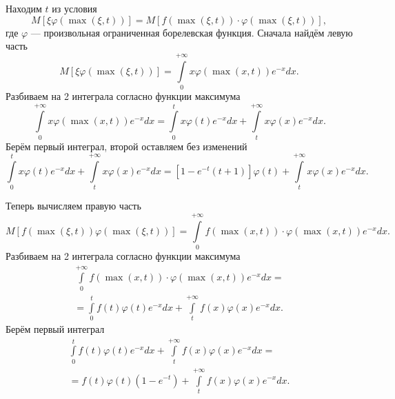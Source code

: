 \begin{enumerate}[label=\alph*)]
  Находим $t$ из условия
  $$M \left[ \xi \varphi \left( \max \left( \xi, t \right) \right) \right] =
    M \left[
      f \left( \max \left( \xi, t \right) \right) \cdot
      \varphi \left( \max \left( \xi, t \right) \right)
    \right],$$
  где $ \varphi $ --- произвольная ограниченная борелевская функция.
  Сначала найдём левую часть
  $$M \left[ \xi \varphi \left( \max \left( \xi, t \right) \right) \right] =
    \int \limits_0^{+ \infty } x \varphi \left( \max \left( x, t \right) \right) e^{-x} dx.$$
  Разбиваем на 2 интеграла согласно функции максимума
  $$ \int \limits_0^{+ \infty } x \varphi \left( \max \left( x, t \right) \right) e^{-x} dx =
    \int \limits_0^t x \varphi \left( t \right) e^{-x} dx +
    \int \limits_t^{+ \infty } x \varphi \left( x \right) e^{-x} dx.$$
  Берём первый интеграл, второй оставляем без изменений
  $$ \int \limits_0^t x \varphi \left( t \right) e^{-x} dx +
    \int \limits_t^{+ \infty } x \varphi \left( x \right) e^{-x} dx =
    \left[ 1 - e^{-t} \left( t + 1 \right) \right] \varphi \left( t \right) +
    \int \limits_t^{+ \infty } x \varphi \left( x \right) e^{-x} dx.$$

  Теперь вычисляем правую часть
  $$M \left[
      f \left( \max \left( \xi, t \right) \right) \varphi \left( \max \left( \xi, t \right) \right)
    \right] =
    \int \limits_0^{+ \infty }
      f \left( \max \left( x, t \right) \right) \cdot
      \varphi \left( \max \left( x, t \right) \right) e^{-x}
    dx.$$
  Разбиваем на 2 интеграла согласно функции максимума
  \begin{equation*}
    \begin{split}
      \int \limits_0^{+ \infty }
        f \left( \max \left( x, t \right) \right) \cdot
        \varphi \left( \max \left( x, t \right) \right) e^{-x}
      dx = \\
      = \int \limits_0^t f \left( t \right) \varphi \left( t \right) e^{-x} dx +
      \int \limits_t^{+ \infty } f \left( x \right) \varphi \left( x \right) e^{-x} dx.
    \end{split}
  \end{equation*}
  Берём первый интеграл
  \begin{equation*}
    \begin{split}
      \int \limits_0^t f \left( t \right) \varphi \left( t \right) e^{-x} dx +
      \int \limits_t^{+ \infty } f \left( x \right) \varphi \left( x \right) e^{-x} dx = \\
      = f \left( t \right) \varphi \left( t \right) \left( 1 - e^{-t} \right) +
      \int \limits_t^{+ \infty } f \left( x \right) \varphi \left( x \right) e^{-x} dx.
    \end{split}
  \end{equation*}


\end{enumerate}

